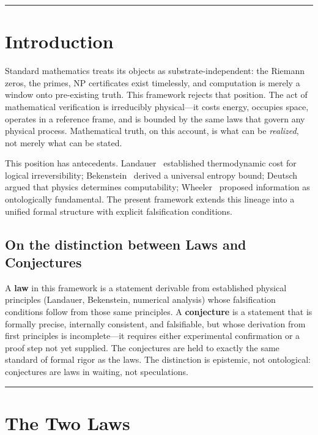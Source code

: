 \documentclass[12pt]{article}
\theoremstyle{lawstyle}
\theoremstyle{conjstyle}
\theoremstyle{predstyle}
\begin{document}
\bigskip
\hrule
\bigskip

\section{Introduction}

Standard mathematics treats its objects as substrate-independent: the Riemann zeros, the
primes, NP certificates exist timelessly, and computation is merely a window onto
pre-existing truth. This framework rejects that position. The act of mathematical
verification is irreducibly physical---it costs energy, occupies space, operates in a
reference frame, and is bounded by the same laws that govern any physical process.
Mathematical truth, on this account, is what can be \emph{realized}, not merely what can
be stated.

This position has antecedents. Landauer~\cite{landauer1961} established thermodynamic cost
for logical irreversibility; Bekenstein~\cite{bekenstein1981} derived a universal entropy
bound; Deutsch~\cite{deutsch1985} argued that physics determines computability;
Wheeler~\cite{wheeler1990} proposed information as ontologically fundamental. The present
framework extends this lineage into a unified formal structure with explicit falsification
conditions.

\subsection*{On the distinction between Laws and Conjectures}

A \textbf{law} in this framework is a statement derivable from established physical
principles (Landauer, Bekenstein, numerical analysis) whose falsification conditions follow
from those same principles. A \textbf{conjecture} is a statement that is formally precise,
internally consistent, and falsifiable, but whose derivation from first principles is
incomplete---it requires either experimental confirmation or a proof step not yet supplied.
The conjectures are held to exactly the same standard of formal rigor as the laws. The
distinction is epistemic, not ontological: conjectures are laws in waiting, not speculations.

\bigskip
\hrule
\bigskip

\section{The Two Laws}
\end{document}
